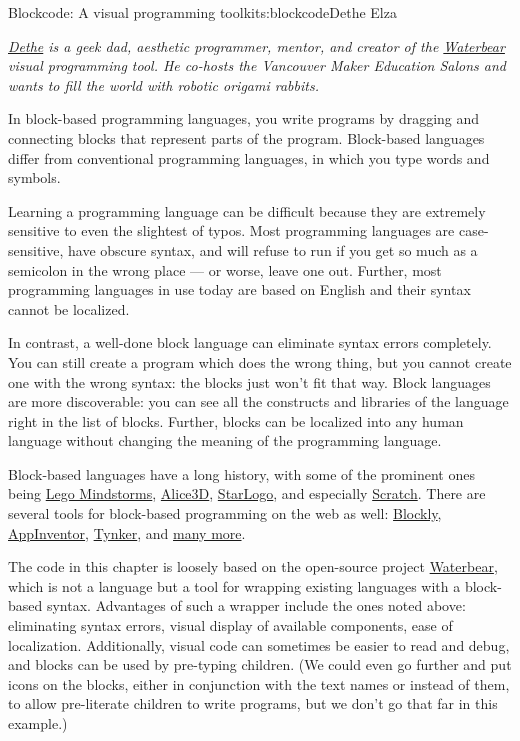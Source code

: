 \begin{aosachapter}{Blockcode: A visual programming toolkit}{s:blockcode}{Dethe Elza}

\emph{\href{https://twitter.com/dethe}{Dethe} is a geek dad, aesthetic
programmer, mentor, and creator of the
\href{http://waterbearlang.com/}{Waterbear} visual programming tool. He
co-hosts the Vancouver Maker Education Salons and wants to fill the
world with robotic origami rabbits.}

In block-based programming languages, you write programs by dragging and
connecting blocks that represent parts of the program. Block-based
languages differ from conventional programming languages, in which you
type words and symbols.

Learning a programming language can be difficult because they are
extremely sensitive to even the slightest of typos. Most programming
languages are case-sensitive, have obscure syntax, and will refuse to
run if you get so much as a semicolon in the wrong place --- or worse,
leave one out. Further, most programming languages in use today are
based on English and their syntax cannot be localized.

In contrast, a well-done block language can eliminate syntax errors
completely. You can still create a program which does the wrong thing,
but you cannot create one with the wrong syntax: the blocks just won't
fit that way. Block languages are more discoverable: you can see all the
constructs and libraries of the language right in the list of blocks.
Further, blocks can be localized into any human language without
changing the meaning of the programming language.


Block-based languages have a long history, with some of the prominent
ones being \href{http://www.lego.com/en-us/mindstorms/}{Lego
Mindstorms}, \href{http://www.alice.org/index.php}{Alice3D},
\href{http://education.mit.edu/projects/starlogo-tng}{StarLogo}, and
especially \href{http://scratch.mit.edu/}{Scratch}. There are several
tools for block-based programming on the web as well:
\href{https://developers.google.com/blockly/}{Blockly},
\href{http://appinventor.mit.edu/explore/}{AppInventor},
\href{http://www.tynker.com/}{Tynker}, and
\href{http://en.wikipedia.org/wiki/Visual_programming_language}{many
more}.

The code in this chapter is loosely based on the open-source project
\href{http://waterbearlang.com/}{Waterbear}, which is not a language but
a tool for wrapping existing languages with a block-based syntax.
Advantages of such a wrapper include the ones noted above: eliminating
syntax errors, visual display of available components, ease of
localization. Additionally, visual code can sometimes be easier to read
and debug, and blocks can be used by pre-typing children. (We could even
go further and put icons on the blocks, either in conjunction with the
text names or instead of them, to allow pre-literate children to write
programs, but we don't go that far in this example.)


\end{aosachapter}
